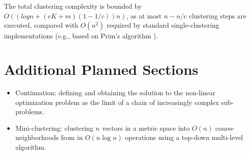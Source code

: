 \documentclass{article} %
\begin{document}
The total clustering complexity is bounded by $O((log n + (c K + m)(1-1/c)) n)$, as at most $n - n/c$ clustering steps are executed, compared with $O(n^2)$ required by standard single-clustering implementations (e.g., based on  Prim's algorithm \cite{clustering_book}).

\section{Additional Planned Sections}
\label{sec:additional}
\begin{itemize}
	\item Continuation: defining and obtaining the solution to the non-linear optimization problem as the limit of a chain of increasingly complex sub-problems.
	\item Mini-clustering: clustering $n$ vectors in a metric space into $O(n)$ coarse neighborhoods from in $O(n \log n)$ operations using a top-down multi-level algorithm. 
\end{itemize}

%



\end{document}
